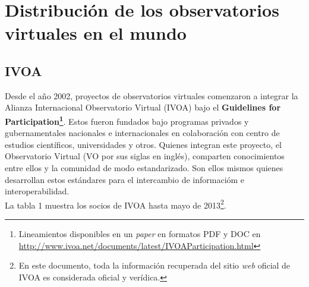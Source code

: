 \documentclass[11pt]{article}
\begin{document}
     \section{Distribuci\'{o}n de los observatorios virtuales en el mundo}
         \subsection{IVOA}
             Desde el a\~{n}o 2002, proyectos de observatorios virtuales
comenzaron a integrar la Alianza Internacional Observatorio Virtual (IVOA) bajo
el \textbf{Guidelines for Participation\footnote{Lineamientos disponibles en un
\textit{paper} en formatos PDF y DOC en
\url{http://www.ivoa.net/documents/latest/IVOAParticipation.html}}}. Estos
fueron fundados bajo programas privados y gubernamentales nacionales e
internacionales en colaboraci\'{o}n con centro de estudios cient\'{i}ficos,
universidades y otros. Quienes integran este proyecto, el Observatorio Virtual
(VO por sus siglas en ingl\'{e}s), comparten conocimientos entre ellos y la
comunidad de modo estandarizado. Son ellos mismos quienes desarrollan estos
est\'{a}ndares para el intercambio de informaci\'{o}m e interoperabilidad.\\
            
             La tabla 1 muestra los socios de IVOA hasta mayo de
2013\footnote{En este documento, toda la informaci\'{o}n recuperada del sitio
\textit{web} oficial de IVOA es considerada oficial y ver\'{i}dica.}.
\end{document}
